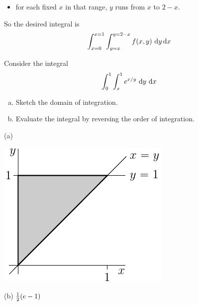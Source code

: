 \begin{solution}
\begin{itemize}
\item
for each fixed $x$ in that range, $y$ runs from $x$ to $2-x$.
\end{itemize}
So the desired integral is
\begin{align*}
\int_{x=0}^{x=1}\int_{y=x}^{y=2-x} f(x,y)\ \mathrm{d}y\,\mathrm{d}x
\end{align*}
\end{solution}

\begin{question}[M200 2004A] %
Consider the integral
\begin{equation*}
\int_0^1\int_x^1 e^{x/y}\ \mathrm{d}y\ \mathrm{d}x
\end{equation*}
\begin{enumerate}[(a)]
\item
Sketch the domain of integration.
\item
Evaluate the integral by reversing the order of integration.
\end{enumerate}
\end{question}

%

\begin{answer}
(a)

\begin{center}
     \includegraphics{fig/OE04Q7a.pdf}
\end{center}

(b) $\tfrac{1}{2}(e-1)$
\end{answer}


